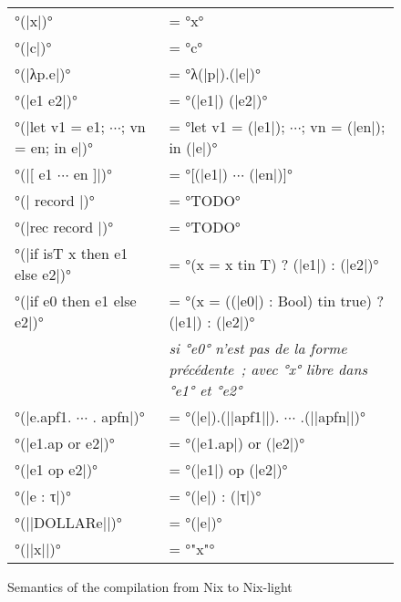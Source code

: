 \begin{figure}
  \begin{tabular}{ll}
    °(|x|)° &= °x° \\
    °(|c|)° &= °c°\\
    °(|λp.e|)° &= °λ(|p|).(|e|)°\\
    °(|e1 e2|)° &= °(|e1|) (|e2|)°\\
    °(|let v1 = e1; $\cdots$; vn = en; in e|)° &=
      °let v1 = (|e1|); $\cdots$; vn = (|en|); in (|e|)°\\
    °(|[ e1 $\cdots$ en ]|)° &= °[(|e1|) $\cdots$ (|en|)]°\\
    °(|{ record }|)° &= °TODO°\\
    °(|rec { record }|)° &= °TODO°\\
    °(|if isT x then e1 else e2|)° &= °(x = x tin T) ? (|e1|) : (|e2|)°\\
    °(|if e0 then e1 else e2|)° &=
      °(x = ((|e0|) : Bool) tin true) ? (|e1|) : (|e2|)°\\
    &{\itshape
      si °e0° n'est pas de la forme précédente ;
      avec °x° libre dans °e1° et °e2°}\\
    °(|e.apf1. $\cdots$ . apfn|)° &= °(|e|).(||apf1||). $\cdots$ .(||apfn||)°\\
    °(|e1.ap or e2|)° &= °(|e1.ap|) or (|e2|)°\\
    °(|e1 op e2|)° &= °(|e1|) op (|e2|)°\\
    °(|e : τ|)° &= °(|e|) : (|τ|)°\\

    °(||DOLLAR{e}||)° &= °(|e|)°\\
    °(||x||)° &= °"x"°
  \end{tabular}
  \caption{Semantics of the compilation from Nix to Nix-light}\label{nix-light::compilation}
\end{figure}
